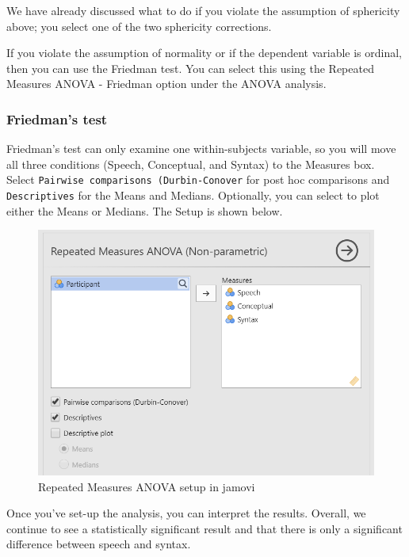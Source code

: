 \documentclass[
]{book}
\begin{document}
We have already discussed what to do if you violate the assumption of sphericity above; you select one of the two sphericity corrections.

If you violate the assumption of normality or if the dependent variable is ordinal, then you can use the Friedman test. You can select this using the Repeated Measures ANOVA - Friedman option under the ANOVA analysis.

\hypertarget{friedmans-test}{%
\subsubsection{Friedman's test}\label{friedmans-test}}

Friedman's test can only examine one within-subjects variable, so you will move all three conditions (Speech, Conceptual, and Syntax) to the Measures box. Select \texttt{Pairwise\ comparisons\ (Durbin-Conover} for post hoc comparisons and \texttt{Descriptives} for the Means and Medians. Optionally, you can select to plot either the Means or Medians. The Setup is shown below.

\begin{figure}

{\centering \includegraphics[width=0.8\linewidth]{images/05-repeated-measures-anova/rm-anova_friedman_setup} 

}

\caption{Repeated Measures ANOVA setup in jamovi}\label{fig:unnamed-chunk-8}
\end{figure}

Once you've set-up the analysis, you can interpret the results. Overall, we continue to see a statistically significant result and that there is only a significant difference between speech and syntax.
\end{document}
